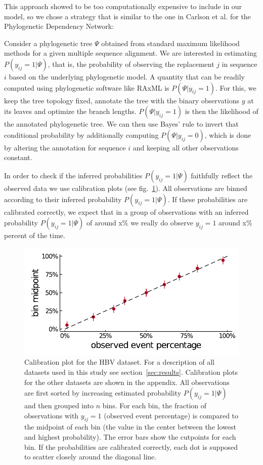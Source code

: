 \documentclass[fleqn,11pt]{SelfArx} %
\begin{document}
This approach showed to be too computationally expensive to include in our model, so we chose a strategy that is similar to the one in Carlson et al. \cite{Carlson2008} for the Phylogenetic Dependency Network:

Consider a phylogenetic tree \(\Psi\) obtained from standard maximum likelihood methods for a given multiple sequence alignment. We are interested in estimating \(P(y_{ij}=1|\Psi)\), that is, the probability of observing the replacement \(j\) in sequence \(i\) based on the underlying phylogenetic model.
A quantity that can be readily computed using phylogenetic software like RAxML \cite{Stamatakis2014} is \(P(\Psi|y_{ij}=1)\). For this, we keep the tree topology fixed, annotate the tree with the binary observations \(y\) at its leaves and optimize the branch lengths. \(P(\Psi|y_{ij}=1)\) is then the likelihood of the annotated phylogenetic tree. We can then use Bayes' rule to invert that conditional probability by additionally computing \(P(\Psi|y_{ij}=0)\), which is done by altering the annotation for sequence \(i\) and keeping all other observations constant.

In order to check if the inferred probabilities \(P(y_{ij}=1|\Psi)\) faithfully reflect the observed data we use calibration plots (see fig.~\ref{fig:phylogeny-calibration}). All observations are binned according to their inferred probability \(P(y_{ij}=1|\Psi)\). If these probabilities are calibrated correctly, we expect that in a group of observations with an inferred probability \(P(y_{ij}=1|\Psi)\) of around x\% we really do observe \(y_{ij}=1\) around x\% percent of the time.

\begin{figure}[!ht]
  \includegraphics[width=1\linewidth]{plots/phylogeny_calibration.pdf}
  \caption{Calibration plot for the HBV dataset. For a description of all datasets used in this study see section~\ref{sec:results}. Calibration plots for the other datasets are shown in the appendix.
  All observations are first sorted by increasing estimated probability \(P(y_{ij}=1|\Psi)\) and then grouped into \(n\) bins.
  For each bin, the fraction of observations with \(y_{ij}=1\) (observed event percentage) is compared to the midpoint of each bin (the value in the center between the lowest and highest probability). The error bars show the cutpoints for each bin. If the probabilities are calibrated correctly, each dot is supposed to scatter closely around the diagonal line.}
  \label{fig:phylogeny-calibration}
\end{figure}
\end{document}
